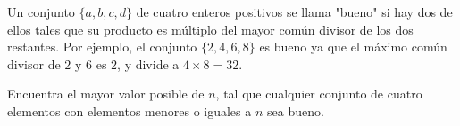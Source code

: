Un conjunto $\{a, b, c, d\}$ de cuatro enteros positivos se llama "bueno" si hay dos de ellos tales que su producto es múltiplo del mayor común divisor de los dos restantes. Por ejemplo, el conjunto $\{2, 4, 6, 8\}$ es bueno ya que el máximo común divisor de $2$ y $6$ es $2$, y divide a $4\times 8=32$. \newline 

Encuentra el mayor valor posible de $n$, tal que cualquier conjunto de cuatro elementos con elementos menores o iguales a $n$ sea bueno.
